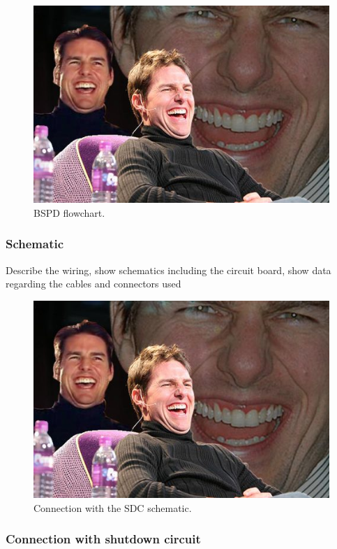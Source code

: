 \begin{figure}[H]
	\centering
	\includegraphics[width=\textwidth]{./img/bspd-position.jpg}
	\caption{BSPD flowchart.}
	\label{fig:BSPD-flowchart}
\end{figure}

\subsubsection{Schematic}
Describe the wiring, show schematics including the circuit board, show data regarding the cables and connectors used

\begin{figure}[H]
	\centering
	\includegraphics[width=\textwidth]{./img/bspd-position.jpg}
	\caption{Connection with the SDC schematic.}
	\label{fig:BSPD-conn}
\end{figure}

\subsubsection{Connection with shutdown circuit}


